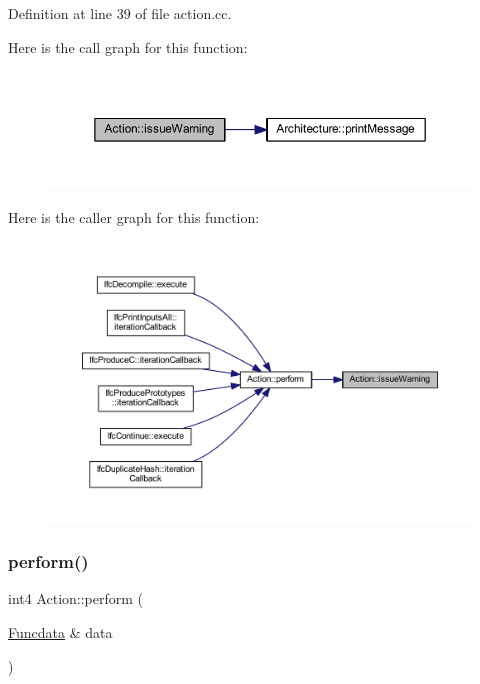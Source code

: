 Definition at line 39 of file action.\+cc.

Here is the call graph for this function\+:
\nopagebreak
\begin{figure}[H]
\begin{center}
\leavevmode
\includegraphics[width=350pt]{class_action_a04e458190e48fb7aeeb49088b92488bd_cgraph}
\end{center}
\end{figure}
Here is the caller graph for this function\+:
\nopagebreak
\begin{figure}[H]
\begin{center}
\leavevmode
\includegraphics[width=350pt]{class_action_a04e458190e48fb7aeeb49088b92488bd_icgraph}
\end{center}
\end{figure}
\mbox{\label{class_action_a44042367ad3fd93c6dba73a41a047c5c}} 
\subsubsection{\texorpdfstring{perform()}{perform()}}
{\footnotesize\ttfamily int4 Action\+::perform (\begin{DoxyParamCaption}\item[{\mbox{\hyperlink{class_funcdata}{Funcdata}} \&}]{data }\end{DoxyParamCaption})}



